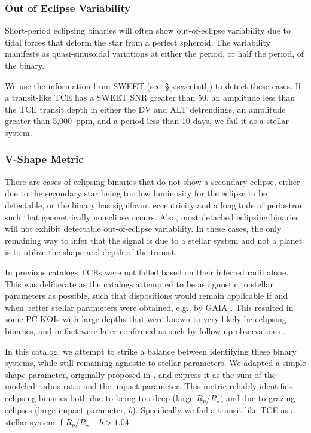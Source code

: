 \subsubsection{Out of Eclipse Variability}
\label{s:sweeteb}
Short-period eclipsing binaries will often show out-of-eclipse variability due to tidal forces that deform the star from a perfect spheroid. The variability manifests as quasi-sinusoidal variations at either the period, or half the period, of the binary.

We use the information from SWEET (see~\S\ref{s:sweetntl}) to detect these cases. If a transit-like TCE has a SWEET SNR greater than 50, an amplitude less than the TCE transit depth in either the DV and ALT detrendings, an amplitude greater than 5,000~ppm, and a period less than 10 days, we fail it as a stellar system.



\subsubsection{V-Shape Metric}
\label{s:shapemetric}
There are cases of eclipsing binaries that do not show a secondary eclipse, either due to the secondary star being too low luminosity for the eclipse to be detectable, or the binary has significant eccentricity and a longitude of periastron such that geometrically no eclipse occurs. Also, most detached eclipsing binaries will not exhibit detectable out-of-eclipse variability. In these cases, the only remaining way to infer that the signal is due to a stellar system and not a planet is to utilize the shape and depth of the transit.

In previous catalogs \citep{Rowe2015cat,Mullally2015cat,Coughlin2016} TCEs were not failed based on their inferred radii alone. This was deliberate as the catalogs attempted to be as agnostic to stellar parameters as possible, such that dispositions would remain applicable if and when better stellar parameters were obtained, e.g., by GAIA \citep{Cacciari2009,Mignard2005}. This resulted in some PC KOIs with large depths that were known to very likely be eclipsing binaries, and in fact were later confirmed as such by follow-up observations \citep{Santerne2016}.

In this catalog, we attempt to strike a balance between identifying these binary systems, while still remaining agnostic to stellar parameters. We adapted a simple shape parameter, originally proposed in \citet{Batalha2013}, and express it as the sum of the modeled radius ratio and the impact parameter. This metric reliably identifies eclipsing binaries both due to being too deep (large $R_{p}$/$R_{\star}$) and due to grazing eclipses (large impact parameter, $b$). Specifically we fail a transit-like TCE as a stellar system if $R_{p}/R_{\star} + b >1.04$.



